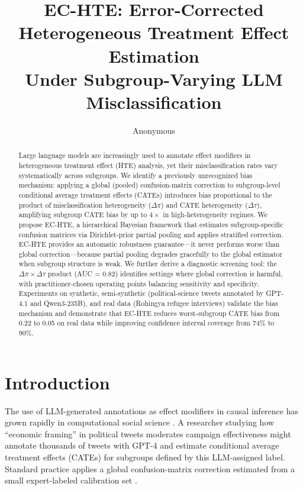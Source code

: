 \documentclass[11pt,a4paper]{article}
\title{EC-HTE: Error-Corrected Heterogeneous Treatment Effect Estimation\\Under Subgroup-Varying LLM Misclassification}
\author{Anonymous}
\date{}
\begin{document}
\maketitle

\begin{abstract}
Large language models are increasingly used to annotate effect modifiers in heterogeneous treatment effect (HTE) analysis, yet their misclassification rates vary systematically across subgroups.
We identify a previously unrecognized bias mechanism: applying a global (pooled) confusion-matrix correction to subgroup-level conditional average treatment effects (CATEs) introduces bias proportional to the product of misclassification heterogeneity ($\Delta\pi$) and CATE heterogeneity ($\Delta\tau$), amplifying subgroup CATE bias by up to $4\times$ in high-heterogeneity regimes.
We propose EC-HTE, a hierarchical Bayesian framework that estimates subgroup-specific confusion matrices via Dirichlet-prior partial pooling and applies stratified correction.
EC-HTE provides an automatic robustness guarantee---it never performs worse than global correction---because partial pooling degrades gracefully to the global estimator when subgroup structure is weak.
We further derive a diagnostic screening tool: the $\Delta\pi \times \Delta\tau$ product (AUC = 0.82) identifies settings where global correction is harmful, with practitioner-chosen operating points balancing sensitivity and specificity.
Experiments on synthetic, semi-synthetic (political-science tweets annotated by GPT-4.1 and Qwen3-235B), and real data (Rohingya refugee interviews) validate the bias mechanism and demonstrate that EC-HTE reduces worst-subgroup CATE bias from 0.22 to 0.05 on real data while improving confidence interval coverage from 74\% to 90\%.
\end{abstract}

\section{Introduction}

The use of LLM-generated annotations as effect modifiers in causal inference has grown rapidly in computational social science \citep{egami2024using,ziems2024can}.
A researcher studying how ``economic framing'' in political tweets moderates campaign effectiveness might annotate thousands of tweets with GPT-4 and estimate conditional average treatment effects (CATEs) for subgroups defined by this LLM-assigned label.
Standard practice applies a global confusion-matrix correction estimated from a small expert-labeled calibration set \citep{angelopoulos2023prediction,egami2024using}.
\end{document}
